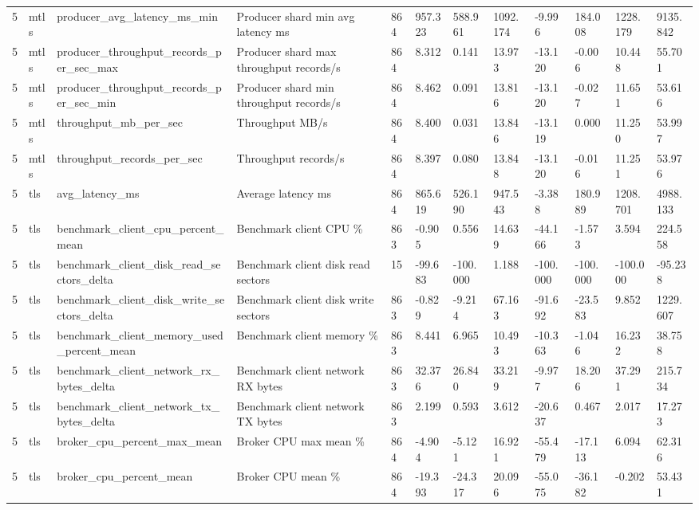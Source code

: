 \begin{longtable}{llllllllllll}
5 & mtls & producer\_avg\_latency\_ms\_min & Producer shard min avg latency ms & 864 & 957.323 & 588.961 & 1092.174 & -9.996 & 184.008 & 1228.179 & 9135.842 \\
5 & mtls & producer\_throughput\_records\_per\_sec\_max & Producer shard max throughput records/s & 864 & 8.312 & 0.141 & 13.973 & -13.120 & -0.006 & 10.448 & 55.701 \\
5 & mtls & producer\_throughput\_records\_per\_sec\_min & Producer shard min throughput records/s & 864 & 8.462 & 0.091 & 13.816 & -13.120 & -0.027 & 11.651 & 53.616 \\
5 & mtls & throughput\_mb\_per\_sec & Throughput MB/s & 864 & 8.400 & 0.031 & 13.846 & -13.119 & 0.000 & 11.250 & 53.997 \\
5 & mtls & throughput\_records\_per\_sec & Throughput records/s & 864 & 8.397 & 0.080 & 13.848 & -13.120 & -0.016 & 11.251 & 53.976 \\
5 & tls & avg\_latency\_ms & Average latency ms & 864 & 865.619 & 526.190 & 947.543 & -3.388 & 180.989 & 1208.701 & 4988.133 \\
5 & tls & benchmark\_client\_cpu\_percent\_mean & Benchmark client CPU \% & 863 & -0.905 & 0.556 & 14.639 & -44.166 & -1.573 & 3.594 & 224.558 \\
5 & tls & benchmark\_client\_disk\_read\_sectors\_delta & Benchmark client disk read sectors & 15 & -99.683 & -100.000 & 1.188 & -100.000 & -100.000 & -100.000 & -95.238 \\
5 & tls & benchmark\_client\_disk\_write\_sectors\_delta & Benchmark client disk write sectors & 863 & -0.829 & -9.214 & 67.163 & -91.692 & -23.583 & 9.852 & 1229.607 \\
5 & tls & benchmark\_client\_memory\_used\_percent\_mean & Benchmark client memory \% & 863 & 8.441 & 6.965 & 10.493 & -10.363 & -1.046 & 16.232 & 38.758 \\
5 & tls & benchmark\_client\_network\_rx\_bytes\_delta & Benchmark client network RX bytes & 863 & 32.376 & 26.840 & 33.219 & -9.977 & 18.206 & 37.291 & 215.734 \\
5 & tls & benchmark\_client\_network\_tx\_bytes\_delta & Benchmark client network TX bytes & 863 & 2.199 & 0.593 & 3.612 & -20.637 & 0.467 & 2.017 & 17.273 \\
5 & tls & broker\_cpu\_percent\_max\_mean & Broker CPU max mean \% & 864 & -4.904 & -5.121 & 16.921 & -55.479 & -17.113 & 6.094 & 62.316 \\
5 & tls & broker\_cpu\_percent\_mean & Broker CPU mean \% & 864 & -19.393 & -24.317 & 20.096 & -55.075 & -36.182 & -0.202 & 53.431 \\

\end{longtable}
